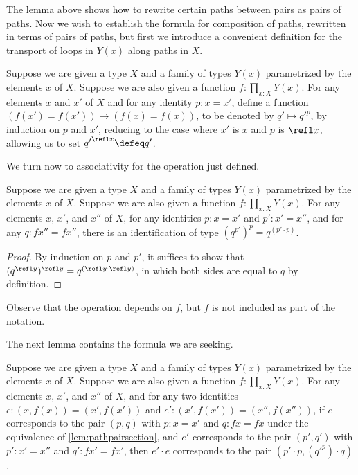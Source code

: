 The lemma above shows how to rewrite certain paths between pairs as pairs of paths.  Now we wish to establish the formula for composition of
paths, rewritten in terms of pairs of paths, but first we introduce a convenient definition for the transport of loops in $Y(x)$ along paths in
$X$.

\begin{definition}\label{def:pathsectionaction}
  Suppose we are given a type $X$ and a family of types $Y(x)$ parametrized by the elements $x$ of $X$.
  Suppose we are also given a function $f : \prod_{x:X} Y(x)$.
  For any elements $x$ and $x'$ of $X$ and for any identity $p : x = x'$, define a function $(f(x') = f(x')) \to (f(x) = f(x))$, to be denoted
  by $q' \mapsto {q'} ^ p$, by induction on $p$ and $x'$, reducing to the case where $x'$ is $x$ and $p$ is $\refl x$, allowing us to
  set ${q'} ^{ \refl x } \defeq q'$.
\end{definition}

We turn now to associativity for the operation just defined.

\begin{lemma}\label{def:pathsectionactionassoc}
  Suppose we are given a type $X$ and a family of types $Y(x)$ parametrized by the elements $x$ of $X$.
  Suppose we are also given a function $f : \prod_{x:X} Y(x)$.
  For any elements $x$, $x'$, and $x''$ of $X$, for any identities $p : x = x'$ and $p' : x' = x''$,
  and for any $q : f x'' = f x''$,
  there is an identification of type $ ( q ^{ p' }) ^ p = q ^{( p' \cdot p )}$.
\end{lemma}

\begin{proof}
  By induction on $p$ and $p'$, it suffices to show that $ ( q ^{ \refl y }) ^ { \refl y } = q ^{( \refl y \cdot \refl y )}$, in which both sides are
  equal to $q$ by definition.
\end{proof}

Observe that the operation depends on $f$, but $f$ is not included as part of the notation.

The next lemma contains the formula we are seeking.

\begin{lemma}\label{lem:pathpairsectionmult}
  Suppose we are given a type $X$ and a family of types $Y(x)$ parametrized by the elements $x$ of $X$.
  Suppose we are also given a function $f : \prod_{x:X} Y(x)$.
  For any elements $x$, $x'$, and $x''$ of $X$, and for any two identities $e : (x,f(x)) = (x',f(x'))$ and $e' : (x',f(x')) = (x'',f(x''))$,
  if $e$ corresponds to the pair $(p,q)$ with $p : x = x'$ and $q : f x = f x$ under the equivalence of \cref{lem:pathpairsection},
  and $e'$ corresponds to the pair $(p',q')$ with $p' : x' = x''$ and $q' : f x' = f x'$,
  then $e' \cdot e$ corresponds to the pair $(p' \cdot p , ({q'} ^ p) \cdot q)$.
\end{lemma}

